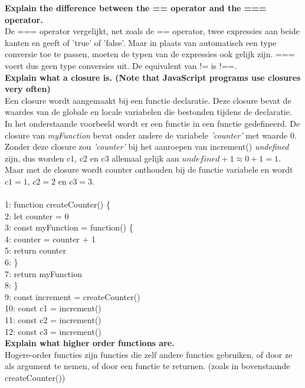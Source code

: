 \documentclass[10pt,a4paper]{article}
\begin{document}
\noindent
\textbf{Explain the difference between the == operator and the === operator.}\\

\noindent
De === operator vergelijkt, net zoals de == operator, twee expressies aan beide kanten en geeft of 'true' of 'false'. Maar in plaats van automatisch een type conversie toe te passen, moeten de typen van de expressies ook gelijk zijn. === voert dus geen type conversies uit. De equivalent van != is !==.\\

\noindent
\textbf{Explain what a closure is. (Note that JavaScript programs use closures very often)}\\

\noindent
Een closure wordt aangemaakt bij een functie declaratie. Deze closure bevat de waardes van de globale en locale variabelen die bestonden tijdens de declaratie. In het onderstaande voorbeeld wordt er een functie in een functie gedefineerd. De closure van \textit{myFunction} bevat onder andere de variabele \textit{'counter'} met waarde 0. Zonder deze closure zou \textit{'counter'} bij het aanroepen van increment() \textit{undefined} zijn, dus worden c1, c2 en c3 allemaal gelijk aan \textit{$undefined + 1 \approx 0 + 1 = 1$}. Maar met de closure wordt counter onthouden bij de functie variabele en wordt $c1 = 1$, $c2 = 2$ en $c3 = 3$.\\
\\
 1: function createCounter() \{\\
 2: \space\space let counter = 0\\
 3: \space\space const myFunction = function() \{\\
 4: \space\space\space\space\space counter = counter + 1\\
 5: \space\space\space\space\space return counter\\
 6: \space\space \}\\
 7: \space\space return myFunction\\
 8: \}\\
 9: const increment = createCounter()\\
10: const c1 = increment()\\
11: const c2 = increment()\\
12: const c3 = increment()\\

\noindent
\textbf{Explain what higher order functions are.}\\

\noindent
Hogere-order functies zijn functies die zelf andere functies gebruiken, of door ze als argument te nemen, of door een functie te returnen. (zoals in bovenstaande createCounter())\\
\end{document}
